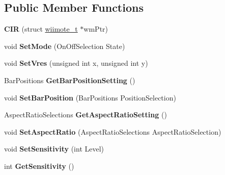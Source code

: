 \subsection*{Public Member Functions}
\begin{DoxyCompactItemize}
\item 
\hypertarget{class_c_i_r_aa57f492413ae0ab3b89df2132333c8aa}{{\bfseries C\-I\-R} (struct \hyperlink{structwiimote__t}{wiimote\-\_\-t} $\ast$wm\-Ptr)}\label{class_c_i_r_aa57f492413ae0ab3b89df2132333c8aa}

\item 
\hypertarget{class_c_i_r_a4c5e1930758120afa38ce8f4404c0cad}{void {\bfseries Set\-Mode} (On\-Off\-Selection State)}\label{class_c_i_r_a4c5e1930758120afa38ce8f4404c0cad}

\item 
\hypertarget{class_c_i_r_a55843dbe557db2a246b72a820d4feb2f}{void {\bfseries Set\-Vres} (unsigned int x, unsigned int y)}\label{class_c_i_r_a55843dbe557db2a246b72a820d4feb2f}

\item 
\hypertarget{class_c_i_r_a234cdafc9ba4f8c71d079be4b628037e}{Bar\-Positions {\bfseries Get\-Bar\-Position\-Setting} ()}\label{class_c_i_r_a234cdafc9ba4f8c71d079be4b628037e}

\item 
\hypertarget{class_c_i_r_a2f53ec4a1467018e7f87e7656e41b973}{void {\bfseries Set\-Bar\-Position} (Bar\-Positions Position\-Selection)}\label{class_c_i_r_a2f53ec4a1467018e7f87e7656e41b973}

\item 
\hypertarget{class_c_i_r_ab66706c98e35632fa825fb51bd40239b}{Aspect\-Ratio\-Selections {\bfseries Get\-Aspect\-Ratio\-Setting} ()}\label{class_c_i_r_ab66706c98e35632fa825fb51bd40239b}

\item 
\hypertarget{class_c_i_r_a086af52543a75cdba5434a57b1846edb}{void {\bfseries Set\-Aspect\-Ratio} (Aspect\-Ratio\-Selections Aspect\-Ratio\-Selection)}\label{class_c_i_r_a086af52543a75cdba5434a57b1846edb}

\item 
\hypertarget{class_c_i_r_a4144e2d3d037de5cd2da3d53d11f1a83}{void {\bfseries Set\-Sensitivity} (int Level)}\label{class_c_i_r_a4144e2d3d037de5cd2da3d53d11f1a83}

\item 
\hypertarget{class_c_i_r_a2898d4e3967661a04b93246f4dda4a40}{int {\bfseries Get\-Sensitivity} ()}\label{class_c_i_r_a2898d4e3967661a04b93246f4dda4a40}


\end{DoxyCompactItemize}
